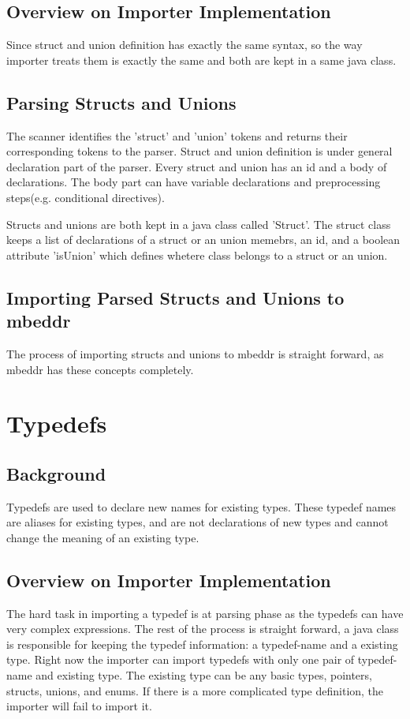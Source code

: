 \documentclass[titlepage]{article}
\begin{document}
\subsection{Overview on Importer Implementation}
Since struct and union definition has exactly the same syntax, so the way importer treats them is exactly the same and both are kept in a same java class.
\subsection{Parsing Structs and Unions}
The scanner identifies the 'struct' and 'union' tokens and returns their corresponding tokens to the parser. Struct and union definition is under general declaration part of the parser. Every struct and union has an id and a body of declarations. The body part can have variable declarations and preprocessing steps(e.g. conditional directives). 

Structs and unions are both kept in a java class called 'Struct'. The struct class keeps a list of declarations of a struct or an union memebrs, an id, and a boolean attribute 'isUnion' which defines whetere class belongs to a struct or an union.
\subsection{Importing Parsed Structs and Unions to mbeddr}
The process of importing structs and unions to mbeddr is straight forward, as mbeddr has these concepts completely. 


\section{Typedefs}
\subsection{Background}
Typedefs are used to declare new names for existing types. These typedef names are aliases for existing types, and are not declarations of new types and cannot change the meaning of an existing type.
\subsection{Overview on Importer Implementation}
The hard task in importing a typedef is at parsing phase as the typedefs can have very complex expressions. The rest of the process is straight forward, a java class is responsible for keeping the typedef information: a typedef-name and a existing type. Right now the importer can import typedefs with only one pair of typedef-name and existing type. The existing type can be any basic types, pointers, structs, unions, and enums. If there is a more complicated type definition, the importer will fail to import it.
\end{document}
